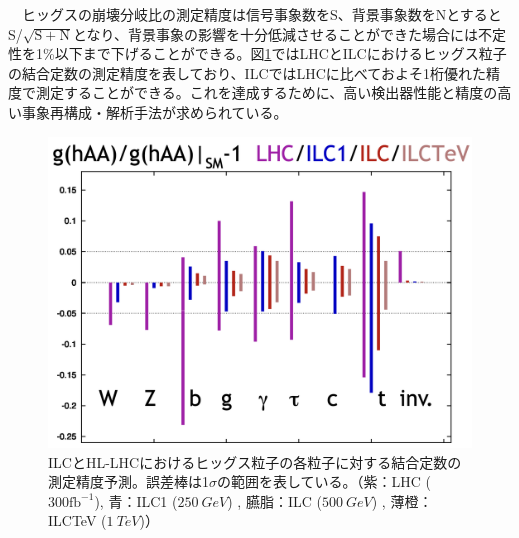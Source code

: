 　ヒッグスの崩壊分岐比の測定精度は信号事象数をS、背景事象数をNとするとS/$\mathrm{\sqrt{S+N}}$となり、背景事象の影響を十分低減させることができた場合には不定性を1\%以下まで下げることができる。図\ref{lhcvsilc}ではLHCとILCにおけるヒッグス粒子の結合定数の測定精度を表しており、ILCではLHCに比べておよそ1桁優れた精度で測定することができる。これを達成するために、高い検出器性能と精度の高い事象再構成・解析手法が求められている。
\begin{figure}[H]
	\begin{center}
 \includegraphics[keepaspectratio, scale=0.3]
 	{Figure/Introduction/lhcvsilc.png}
 		\caption{ILCとHL-LHCにおけるヒッグス粒子の各粒子に対する結合定数の測定精度予測。誤差棒は1$\sigma$の範囲を表している。（紫：LHC ($300 \mathrm{fb^{-1}}$), 青：ILC1 ($\SI{250}{GeV}$) , 臙脂：ILC ($\SI{500}{GeV}$) , 薄橙：ILCTeV ($\SI{1}{TeV}$)）\cite{decaybsm}}
 		\label{lhcvsilc}
	\end{center}
\end{figure}

